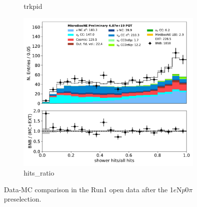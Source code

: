 \documentclass[a4paper]{article}
\newcommand{\npsel}{1$e$N$p$0$\pi$ }
\begin{document}
\begin{figure}[H]
\begin{center}
\begin{subfigure}[b]{0.3\textwidth}
    \caption{\label{fig:1eNp:dataMCRun1:trkpid} trkpid }
    \end{subfigure}
    \begin{subfigure}[b]{0.3\textwidth}
    \centering
    \includegraphics[width=1.00\textwidth]{1eNp/dataMCRun1/hits_ratio01152020.pdf}
    \caption{\label{fig:1eNp:dataMCRun1:hits_ratio} hits\_ratio }
    \end{subfigure}
\caption{\label{fig:1eNp:dataMCRun1:cosmic}Data-MC comparison in the Run1 open data after the \npsel preselection.}
\end{center}
\end{figure}
\end{document}
